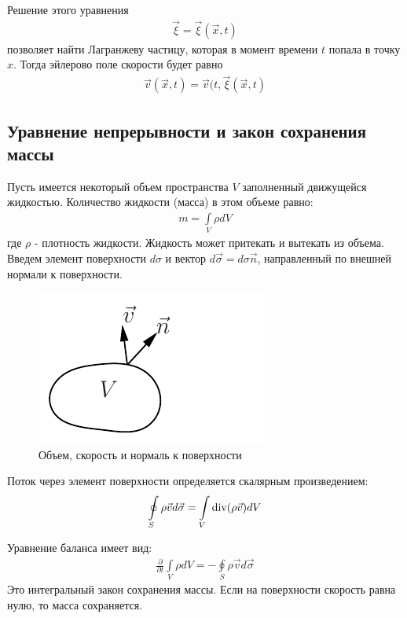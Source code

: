 Решение этого уравнения 
\begin{align*} 
\vec{\xi}=\vec{\xi}(\vec{x}, t)
\end{align*}
позволяет найти Лагранжеву частицу, которая в момент времени $t$ попала в точку $x$. Тогда эйлерово поле скорости будет равно
\begin{align*} 
\vec{v}(\vec{x}, t)=\vec{v}(t, \vec{\xi}(\vec{x}, t)
\end{align*}
\subsection{Уравнение непрерывности и закон сохранения массы}
Пусть имеется некоторый объем пространства $V$ заполненный движущейся  жидкостью. Количество жидкости (масса) в этом объеме равно:
\begin{align*} 
m=\int\limits_{V} \rho d V
\end{align*}
где $\rho$ - плотность жидкости. Жидкость может притекать и вытекать из объема. Введем элемент поверхности $ d \sigma $ и вектор $ d \vec{\sigma}=d \sigma \vec{n} $, направленный по внешней нормали к поверхности. 
\begin{figure}[H]
	\vspace{-10pt}
	\centering
	\includegraphics[scale=1]{photo/4.pdf}
	\caption{Объем, скорость и нормаль к поверхности}
	\label{fig:figure4}
\end{figure}
Поток через элемент поверхности определяется скалярным произведением:
\begin{align*}
\oint\limits_{S} \rho \vec{v} d \vec{\sigma}=\int\limits_{V} \operatorname{div}(\rho \vec{v}) d V
\end{align*}


Уравнение баланса имеет вид:
\begin{align*} 
\frac{\partial}{\partial t} \int\limits_{V} \rho d V=-\oint\limits_{S} \rho \vec{v} d \vec{\sigma}
\end{align*}
Это интегральный закон сохранения массы. Если на поверхности скорость равна нулю, то масса сохраняется.

